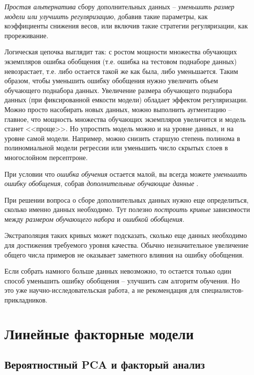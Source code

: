 \documentclass[%
	11pt,
	a4paper,
	utf8,
]{article}
\begin{document}
\emph{Простая альтернатива} сбору дополнительных данных -- \emph{уменьшить размер модели или улучшить регуляризацию}, добавив такие параметры, как коэффициенты снижения весов, или включив такие стратегии регуляризации, как прореживание.

Логическая цепочка выглядит так: с ростом мощности множества обучающих экземпляров ошибка обобщения (т.е. ошибка на тестовом поднаборе данных) невозрастает, т.е. либо остается такой же как была, либо уменьшается. Таким образом, чтобы уменьшить ошибку обобщения нужно увеличить объем обучающего поднабора данных. Увеличение размера обучающего поднабора данных (при фиксированной емкости модели) обладает эффектом регуляризации. Можно просто насобирать новых данных, можно выполнить аугментацию -- главное, что мощность множества обучающих экземпляров увеличится и модель станет <<проще>>. Но упростить модель можно и на уровне данных, и на уровне самой модели. Например, можно снизить старшую степень полинома в полиномиальной модели регрессии или уменьшить число скрытых слоев в многослойном персептроне.

{\color{blue}
При условии что \emph{ошибка обучения} остается малой, вы всегда можете \emph{уменьшить ошибку обобщения}, собрав \emph{дополнительные обучающие данные} \cite[]{goodfellow:ml-2018}.
}

При решении вопроса о сборе дополнительных данных нужно еще определиться, сколько именно данных необходимо. Тут полезно \emph{построить кривые} зависимости между \emph{размером обучающего набора} и \emph{ошибкой обобщения}.

Экстраполяция таких кривых может подсказать, сколько еще данных необходимо для достижения требуемого уровня качества. Обычно незначительное увеличение общего числа примеров не оказывает заметного влияния на ошибку обобщения.

Если собрать намного больше данных невозможно, то остается только один способ уменьшить ошибку обобщения -- улучшить сам алгоритм обучения. Но это уже научно-исследовательская работа, а не рекомендация для специалистов-прикладников.

\section{Линейные факторные модели}

\subsection{Вероятностный PCA и факторый анализ}
\end{document}
